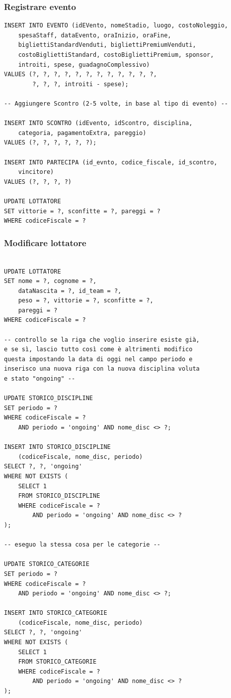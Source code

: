 \documentclass[a4paper,12pt]{report}
\begin{document}
\subsubsection{Registrare evento}
\begin{verbatim}
INSERT INTO EVENTO (idEVento, nomeStadio, luogo, costoNoleggio,
    spesaStaff, dataEvento, oraInizio, oraFine, 
    bigliettiStandardVenduti, bigliettiPremiumVenduti, 
    costoBigliettiStandard, costoBigliettiPremium, sponsor, 
    introiti, spese, guadagnoComplessivo)
VALUES (?, ?, ?, ?, ?, ?, ?, ?, ?, ?, ?, ?, 
        ?, ?, ?, introiti - spese);

-- Aggiungere Scontro (2-5 volte, in base al tipo di evento) --

INSERT INTO SCONTRO (idEvento, idScontro, disciplina, 
    categoria, pagamentoExtra, pareggio)
VALUES (?, ?, ?, ?, ?, ?);

INSERT INTO PARTECIPA (id_evnto, codice_fiscale, id_scontro, 
    vincitore)
VALUES (?, ?, ?, ?)

UPDATE LOTTATORE
SET vittorie = ?, sconfitte = ?, pareggi = ?
WHERE codiceFiscale = ?

\end{verbatim}
\subsubsection{Modificare lottatore}
\begin{verbatim}

UPDATE LOTTATORE 
SET nome = ?, cognome = ?,
    dataNascita = ?, id_team = ?, 
    peso = ?, vittorie = ?, sconfitte = ?,
    pareggi = ?
WHERE codiceFiscale = ?

-- controllo se la riga che voglio inserire esiste già, 
e se sì, lascio tutto così come è altrimenti modifico 
questa impostando la data di oggi nel campo periodo e 
inserisco una nuova riga con la nuova disciplina voluta 
e stato "ongoing" --

UPDATE STORICO_DISCIPLINE
SET periodo = ?
WHERE codiceFiscale = ? 
    AND periodo = 'ongoing' AND nome_disc <> ?;

INSERT INTO STORICO_DISCIPLINE 
    (codiceFiscale, nome_disc, periodo)
SELECT ?, ?, 'ongoing'
WHERE NOT EXISTS (
    SELECT 1
    FROM STORICO_DISCIPLINE
    WHERE codiceFiscale = ?
        AND periodo = 'ongoing' AND nome_disc <> ?
);

-- eseguo la stessa cosa per le categorie --

UPDATE STORICO_CATEGORIE
SET periodo = ?
WHERE codiceFiscale = ? 
    AND periodo = 'ongoing' AND nome_disc <> ?;

INSERT INTO STORICO_CATEGORIE 
    (codiceFiscale, nome_disc, periodo)
SELECT ?, ?, 'ongoing'
WHERE NOT EXISTS (
    SELECT 1
    FROM STORICO_CATEGORIE
    WHERE codiceFiscale = ?
        AND periodo = 'ongoing' AND nome_disc <> ?
);
    
\end{verbatim}
\end{document}
